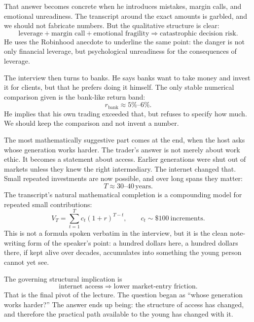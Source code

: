 That answer becomes concrete when he introduces mistakes, margin calls, and emotional unreadiness. The transcript around the exact amounts is garbled, and we should not fabricate numbers. But the qualitative structure is clear:
\begin{equation}
\text{leverage} + \text{margin call} + \text{emotional fragility}
\Rightarrow
\text{catastrophic decision risk}.
\end{equation}
He uses the Robinhood anecdote to underline the same point: the danger is not only financial leverage, but psychological unreadiness for the consequences of leverage.

The interview then turns to banks. He says banks want to take money and invest it for clients, but that he prefers doing it himself. The only stable numerical comparison given is the bank-like return band:
\begin{equation}
r_{\text{bank}} \approx 5\%\text{--}6\%.
\end{equation}
He implies that his own trading exceeded that, but refuses to specify how much. We should keep the comparison and not invent a number.

The most mathematically suggestive part comes at the end, when the host asks whose generation works harder. The trader's answer is not merely about work ethic. It becomes a statement about access. Earlier generations were shut out of markets unless they knew the right intermediary. The internet changed that. Small repeated investments are now possible, and over long spans they matter:
\begin{equation}
T \approx 30\text{--}40\,\text{years}.
\end{equation}
The transcript's natural mathematical completion is a compounding model for repeated small contributions:
\begin{equation}
V_T = \sum_{t=1}^{T} c_t(1+r)^{T-t},
\qquad
c_t \sim \$100\ \text{increments}.
\end{equation}
This is not a formula spoken verbatim in the interview, but it is the clean note-writing form of the speaker's point: a hundred dollars here, a hundred dollars there, if kept alive over decades, accumulates into something the young person cannot yet see.

The governing structural implication is
\begin{equation}
\text{internet access} \Rightarrow \text{lower market-entry friction}.
\end{equation}
That is the final pivot of the lecture. The question began as ``whose generation works harder?'' The answer ends up being: the structure of access has changed, and therefore the practical path available to the young has changed with it.

